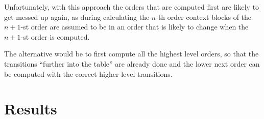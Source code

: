 \documentclass[a4paper]{scrreprt}
\begin{document}

Unfortunately, with this approach the orders that are computed first are likely
to get messed up again, as during calculating the \(n\)-th order context blocks
of the \(n + 1\)-st order are assumed to be in an order that is likely to change
when the \(n + 1\)-st order is computed.

The alternative would be to first compute all the highest level orders, so that
the transitions ``further into the table'' are already done and the lower next
order can be computed with the correct higher level transitions. 

\section{Results}
\end{document}
